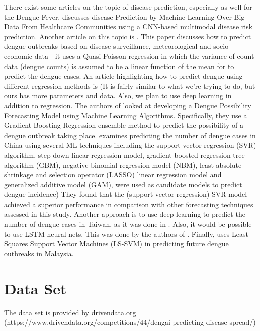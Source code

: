 \documentclass[english]{article}
\begin{document}
There exist some articles on the topic of disease prediction, especially as well for the Dengue Fever.
\cite{7912315} discusses disease Prediction by Machine Learning Over Big Data From Healthcare Communities using a CNN-based multimodal disease risk prediction. Another article on this topic is \cite{jain2019prediction}. This paper discusses how to predict dengue outbreaks based on disease surveillance, meteorological and socio-economic data - it uses a Quasi-Poisson regression in which the variance of count data (dengue counts) is assumed to be a linear function of the mean for to predict the dengue cases.
An article highlighting how to predict dengue using different regression methods is \cite{connor_2018} (It is fairly similar to what we're trying to do, but ours has more parameters and data. Also, we plan to use deep learning in addition to regression. 
The authors of \cite{muhilthini2018dengue} looked at developing a Dengue Possibility Forecasting Model using Machine Learning Algorithms. Specifically, they use a Gradient Boosting Regression ensemble method to predict the possibility of a dengue outbreak taking place.
\cite{10.1371/journal.pntd.0005973} examines predicting the number of dengue cases in China using several ML techniques including the support vector regression (SVR) algorithm, step-down linear regression model, gradient boosted regression tree algorithm (GBM), negative binomial regression model (NBM), least absolute shrinkage and selection operator (LASSO) linear regression model and generalized additive model (GAM), were used as candidate models to predict dengue incidence) They found that the (support vector regression) SVR model achieved a superior performance in comparison with other forecasting techniques assessed in this study.
Another approach is to use deep learning to predict the number of dengue cases in Taiwan, as it was done in \cite{anno2018environmental}.
Also, it would be possible to use LSTM neural nets. This was done by the authors of \cite{yusof2011}.
Finally, \cite{Xu760702} uses Least Squares Support Vector Machines (LS-SVM) in predicting future dengue outbreaks in Malaysia.

\section{Data Set}

The data set is provided by drivendata.org (https://www.drivendata.org/competitions/44/dengai-predicting-disease-spread/)\\
\end{document}
